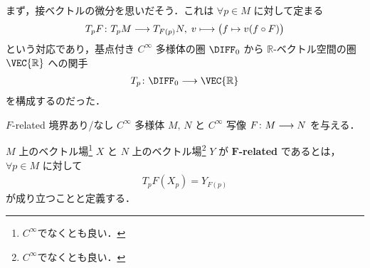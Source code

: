 \documentclass[geometry_main]{subfiles}
\begin{document}
まず，接ベクトルの微分を思いだそう．これは $\forall p \in M$ に対して定まる
\begin{align}
    T_{p} F \colon T_p M \longrightarrow T_{F(p)} N,\; v \longmapsto \bigl(f \mapsto v(f \circ F)\bigr)
\end{align}
という対応であり，基点付き $C^\infty$ 多様体の圏 $\DIFF_0$ から $\mathbb{R}$-ベクトル空間の圏 $\VEC{\mathbb{R}}$ への関手
\begin{align}
    T_p \colon \DIFF_0 \lto \VEC{\mathbb{R}}
\end{align}
を構成するのだった．

\begin{mydef}[label=def:F-related]{$F$-related}
    境界あり/なし $C^\infty$ 多様体 $M,\, N$ と $C^\infty$ 写像 $F \colon M \longrightarrow N$ を与える．

    $M$ 上のベクトル場\footnote{\hyperref[def:vecf]{$C^\infty$}でなくとも良い．} $X$ と $N$ 上のベクトル場\footnote{\hyperref[def:vecf]{$C^\infty$}でなくとも良い．} $Y$ が $\bm{F}$\textbf{-related} であるとは，
    $\forall p \in M$ に対して
    \begin{align}
        T_p F (X_p) = Y_{F(p)}
    \end{align}
    が成り立つことと定義する．
\end{mydef}
\end{document}
